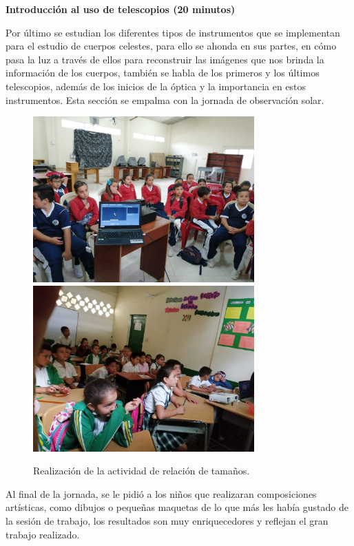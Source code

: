 \documentclass[a4paper,10pt]{article}
\begin{document}
\vspace{2mm}

\noindent \textbf{Introducción al uso de telescopios (20 minutos)}

\vspace{2mm}

\noindent Por último se estudian los diferentes tipos de instrumentos que se implementan para el estudio de cuerpos celestes, para ello se ahonda en sus partes, en cómo pasa la luz a través de ellos para reconstruir las imágenes que nos brinda la información de los cuerpos, también se habla de los primeros y los últimos telescopios, además de los inicios de la óptica y la importancia en estos instrumentos. Esta sección se empalma con la jornada de observación solar. 


\begin{figure}[H]
    \centering
    \includegraphics[width=8.5cm]{clavellinas/sanluis-exp.jpeg}
    \includegraphics[width=8.5cm]{clavellinas/portico.jpeg}
    \caption{Realización de la actividad de relación de tamaños.}
\end{figure}

\noindent Al final de la jornada, se le pidió a los niños que realizaran composiciones artísticas, como dibujos o pequeñas maquetas de lo que más les había gustado de la sesión de trabajo, los resultados son muy enriquecedores y reflejan el gran trabajo realizado.
\end{document}
